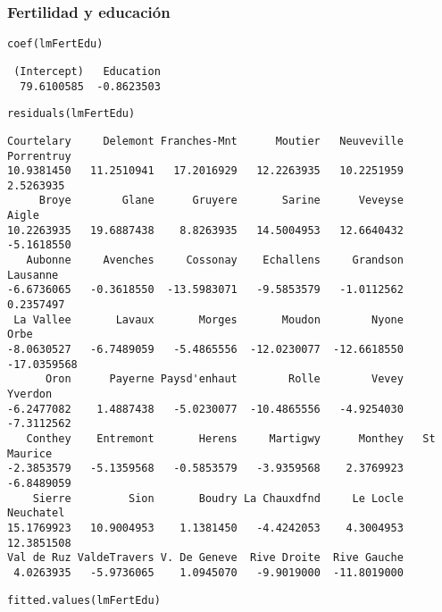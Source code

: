 \documentclass[bigger]{beamer}
\begin{document}
\begin{frame}[fragile]
\frametitle{Fertilidad y educación}
\label{sec-3-2}


\lstset{language=R}
\begin{lstlisting}
coef(lmFertEdu)
\end{lstlisting}

\begin{verbatim}
 (Intercept)   Education 
  79.6100585  -0.8623503
\end{verbatim}


\lstset{language=R}
\begin{lstlisting}
residuals(lmFertEdu)
\end{lstlisting}


\begin{verbatim}
Courtelary     Delemont Franches-Mnt      Moutier   Neuveville   Porrentruy 
10.9381450   11.2510941   17.2016929   12.2263935   10.2251959    2.5263935 
     Broye        Glane      Gruyere       Sarine      Veveyse        Aigle 
10.2263935   19.6887438    8.8263935   14.5004953   12.6640432   -5.1618550 
   Aubonne     Avenches     Cossonay    Echallens     Grandson     Lausanne 
-6.6736065   -0.3618550  -13.5983071   -9.5853579   -1.0112562    0.2357497 
 La Vallee       Lavaux       Morges       Moudon        Nyone         Orbe 
-8.0630527   -6.7489059   -5.4865556  -12.0230077  -12.6618550  -17.0359568 
      Oron      Payerne Paysd'enhaut        Rolle        Vevey      Yverdon 
-6.2477082    1.4887438   -5.0230077  -10.4865556   -4.9254030   -7.3112562 
   Conthey    Entremont       Herens     Martigwy      Monthey   St Maurice 
-2.3853579   -5.1359568   -0.5853579   -3.9359568    2.3769923   -6.8489059 
    Sierre         Sion       Boudry La Chauxdfnd     Le Locle    Neuchatel 
15.1769923   10.9004953    1.1381450   -4.4242053    4.3004953   12.3851508 
Val de Ruz ValdeTravers V. De Geneve  Rive Droite  Rive Gauche 
 4.0263935   -5.9736065    1.0945070   -9.9019000  -11.8019000
\end{verbatim}


\lstset{language=R}
\begin{lstlisting}
fitted.values(lmFertEdu)
\end{lstlisting}



\end{frame}
\end{document}
